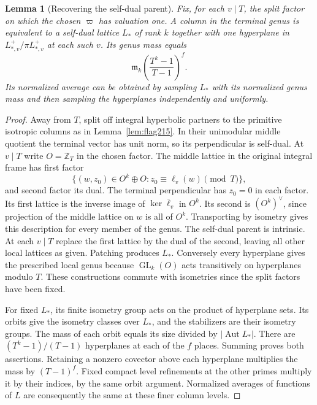 \documentclass[a4paper,11pt]{article}
\newtheorem{lemma}[proposition]{Lemma}
\theoremstyle{definition}
\theoremstyle{remark}
\newcommand{\ZZ}{\mathbb Z}\newcommand{\ord}{\operatorname{ord}}
\numberwithin{equation}{section}
\newcommand{\Aut}{\operatorname{Aut}}
\newcommand{\GL}{\operatorname{GL}}
\begin{document}
\begin{lemma}[Recovering the self-dual parent]
\label{lem:termparent221}
Fix, for each \(v\mid T\), the split factor on which the
chosen \(\varpi\) has valuation one. A column in the terminal
genus is equivalent to a self-dual lattice \(L_*\) of rank
\(k\) together with one hyperplane in \(L_{*,v}^+/\pi L_{*,v}^+\)
at each such \(v\). Its genus mass equals
\[
           \mathfrak m_k\left(\frac{T^k-1}{T-1}\right)^f .
\]
Its normalized average can be obtained by sampling \(L_*\)
with its normalized genus mass and then sampling the
hyperplanes independently and uniformly.
\end{lemma}
\begin{proof}
Away from \(T\), split off integral hyperbolic partners to
the primitive isotropic columns as in
Lemma~\ref{lem:flag215}. In their unimodular middle quotient
the terminal vector has unit norm, so its perpendicular
is self-dual. At \(v\mid T\) write \(O=\ZZ_T\) in the chosen
factor. The middle lattice in the original integral
frame has first factor
\[
          \{(w,z_0)\in O^k\oplus O:
                      z_0\equiv \ell_v(w)\pmod T\},
\]
and second factor its dual. The terminal perpendicular has
\(z_0=0\) in each factor. Its first lattice is the inverse
image of \(\ker\bar\ell_v\) in \(O^k\). Its second is
\((O^k)^\vee\), since projection of the middle lattice on
\(w\) is all of \(O^k\). Transporting by isometry gives this
description for every member of the genus. The self-dual
parent is intrinsic. At each \(v\mid T\) replace the first
lattice by the dual of the second, leaving all other local
lattices as given. Patching produces \(L_*\). Conversely
every hyperplane gives the prescribed local genus because
\(\GL_k(O)\) acts transitively on hyperplanes modulo \(T\).
These constructions commute with isometries since the split
factors have been fixed.

For fixed \(L_*\), its finite isometry group acts on the
product of hyperplane sets. Its orbits give the isometry
classes over \(L_*\), and the stabilizers are their isometry
groups. The mass of each orbit equals its size divided by
\(|\Aut L_*|\). There are \((T^k-1)/(T-1)\) hyperplanes
at each of the \(f\) places. Summing proves both assertions.
Retaining a nonzero covector above each hyperplane multiplies
the mass by \((T-1)^f\). Fixed compact level refinements at
the other primes multiply it by their indices, by the same
orbit argument. Normalized averages of functions of \(L\)
are consequently the same at these finer column levels.
\end{proof}
\end{document}
